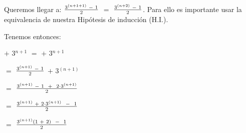 \documentclass[12pt]{article}
\begin{document}
Queremos llegar a: {\LARGE{{$\frac{3^{(n+1+1)} \hspace{0.1cm} - \hspace{0.1cm} 1}{2}$}}} $=$ {\LARGE{{$\frac{3^{(n+2)} \hspace{0.1cm} - \hspace{0.1cm} 1}{2}$}}}. Para ello es importante usar la equivalencia de nuestra  {\textcolor{verde_manzana}{Hipótesis de inducción (H.I.). }}  \vspace{0.2cm}

Tenemos entonces: \vspace{0.5cm}

\hspace{1cm} {\textcolor{verde_manzana}{}} $+$ 3$^{n+1}$ $=$ {\textcolor{verde_manzana}{}} $+$ 3$^{n+1}$ \vspace{0.2cm}

\hspace{7.7cm} $=$ {\LARGE{{$\frac{3^{(n+1)} \hspace{0.1cm} - \hspace{0.1cm} 1}{2}$}}} $+$ 3$^{(n+1)}$ \vspace{0.2cm}

\hspace{7.7cm} $=$  {\LARGE{{$\frac{3^{(n+1)} \hspace{0.1cm} - \hspace{0.1cm} 1 \hspace{0.2cm} + \hspace{0.2cm} 2 \cdot 3^{(n+1)}}{2}$}}} \vspace{0.2cm}

\hspace{7.7cm} $=$ {\LARGE{{$\frac{3^{(n+1)} \hspace{0.1cm} + \hspace{0.1cm} 2 \cdot 3^{(n+1)} \hspace{0.2cm} - \hspace{0.2cm} 1}{2}$}}} \vspace{0.2cm}
 
\hspace{7.7cm} $=$ {\LARGE{{$\frac{3^{(n+1)} (1 \hspace{0.1cm} + \hspace{0.1cm} 2 ) \hspace{0.2cm} - \hspace{0.2cm} 1}{2}$}}} \vspace{0.2cm}
\end{document}

